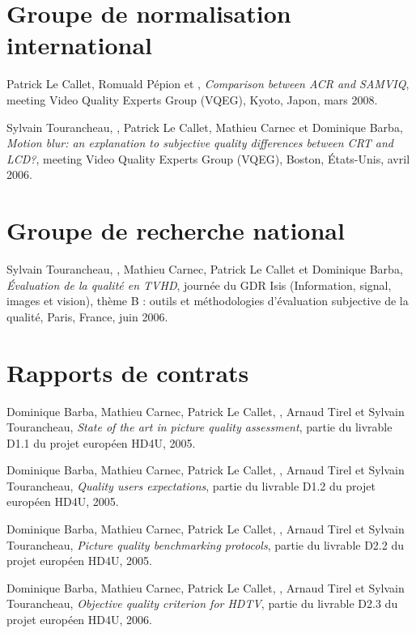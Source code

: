 \section*{Groupe de normalisation international}
\noindent Patrick Le Callet, Romuald Pépion et , \emph{Comparison between ACR and SAMVIQ}, meeting Video Quality Experts Group (VQEG), Kyoto, Japon, mars 2008.

\bigskip

\noindent Sylvain Tourancheau, , Patrick Le Callet, Mathieu Carnec et Dominique Barba, \emph{Motion blur: an explanation to subjective quality differences between CRT and LCD?}, meeting Video Quality Experts Group (VQEG), Boston, États-Unis, avril 2006.


\section*{Groupe de recherche national}
\noindent Sylvain Tourancheau, , Mathieu Carnec, Patrick Le Callet et Dominique Barba, \emph{Évaluation de la qualité en TVHD}, journée du GDR Isis (Information, signal, images et vision), thème B : outils et méthodologies d'évaluation subjective de la qualité, Paris, France, juin 2006.


\section*{Rapports de contrats}
\noindent Dominique Barba, Mathieu Carnec, Patrick Le Callet, , Arnaud Tirel et Sylvain Tourancheau, \emph{State of the art in picture quality assessment}, partie du livrable D1.1 du projet européen HD4U, 2005.

\bigskip

\noindent Dominique Barba, Mathieu Carnec, Patrick Le Callet, , Arnaud Tirel et Sylvain Tourancheau, \emph{Quality users expectations}, partie du livrable D1.2 du projet européen HD4U, 2005.

\bigskip

\noindent Dominique Barba, Mathieu Carnec, Patrick Le Callet, , Arnaud Tirel et Sylvain Tourancheau, \emph{Picture quality benchmarking protocols}, partie du livrable D2.2 du projet européen HD4U, 2005.

\bigskip

\noindent Dominique Barba, Mathieu Carnec, Patrick Le Callet, , Arnaud Tirel et Sylvain Tourancheau, \emph{Objective quality criterion for HDTV}, partie du livrable D2.3 du projet européen HD4U, 2006.

